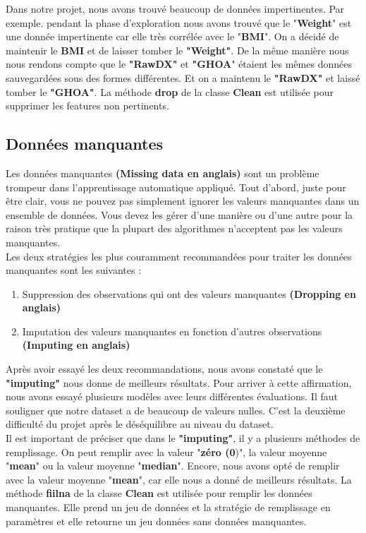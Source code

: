 \documentclass[12pt, french]{report}
\begin{document}
Dans notre projet, nous avons trouvé beaucoup de données impertinentes. Par exemple. pendant la phase d'exploration nous avons trouvé que le "\textbf{Weight}" est une donnée impertinente car elle très corrélée avec le "\textbf{BMI}". On a décidé de maintenir le \textbf{BMI} et de laisser tomber le \textbf{"Weight"}.  De la même manière nous nous rendons compte que le \textbf{"RawDX"} et \textbf{"GHOA}" étaient les mêmes données sauvegardées sous des formes différentes. Et on a maintenu le \textbf{"RawDX"} et laissé tomber le \textbf{"GHOA"}. La méthode \textbf{drop} de la classe \textbf{Clean} est utilisée pour supprimer les features non pertinents.  

\subsection{Données manquantes}
Les données manquantes \textbf{(Missing data en anglais)} sont un problème trompeur dans l'apprentissage automatique appliqué. Tout d'abord, juste pour être clair, vous ne pouvez pas simplement ignorer les valeurs manquantes dans un ensemble de données. Vous devez les gérer d'une manière ou d'une autre pour la raison très pratique que la plupart des algorithmes n'acceptent pas les valeurs manquantes.\\

Les deux stratégies les plus couramment recommandées pour traiter les données manquantes sont les suivantes \cite{key21}:
\begin{enumerate}
\item Suppression des observations qui ont des valeurs manquantes \textbf{(Dropping en anglais)}
\item Imputation des valeurs manquantes en fonction d'autres observations \textbf{(Imputing en anglais)}
\end{enumerate}

Après avoir essayé les deux recommandations, nous avons constaté que le \textbf{"imputing"} nous donne de meilleurs résultats. Pour arriver à cette affirmation, nous avons essayé plusieurs modèles avec leurs différentes évaluations. Il faut souligner que notre dataset a de beaucoup de valeurs nulles. C'est la deuxième difficulté du projet après le déséquilibre au niveau du dataset. \\

Il est important de préciser que dans le  \textbf{"imputing"}, il y a plusieurs méthodes de remplissage. On peut remplir avec la valeur "\textbf{zéro (0})", la valeur moyenne "\textbf{mean}" ou la valeur moyenne "\textbf{median}". Encore, nous avons opté de remplir avec la valeur moyenne "\textbf{mean}", car elle nous a donné de meilleurs résultats. La méthode \textbf{fiilna} de la classe \textbf{Clean} est utilisée pour remplir les données manquantes. Elle prend un jeu de données et la stratégie de remplissage en paramètres et elle retourne un jeu données sans données manquantes. \\
\end{document}
